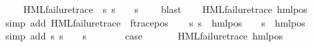 \begin{isabellebody}
\ \isamarkupfalse%
\ {\isasympsi}\ \ {\isachardoublequoteopen}HML{\isacharunderscore}{\kern0pt}failure{\isacharunderscore}{\kern0pt}trace\ {\isasympsi}{\isachardoublequoteclose}\ {\isachardoublequoteopen}{\isacharparenleft}{\kern0pt}{\isasymforall}s{\isachardot}{\kern0pt}\ {\isacharparenleft}{\kern0pt}s\ {\isasymTurnstile}\ {\isasymphi}{\isacharparenright}{\kern0pt}\ {\isacharequal}{\kern0pt}\ {\isacharparenleft}{\kern0pt}s\ {\isasymTurnstile}\ {\isasympsi}{\isacharparenright}{\kern0pt}{\isacharparenright}{\kern0pt}{\isachardoublequoteclose}\ \isamarkupfalse%
\ blast\isanewline
\ \ \isamarkupfalse%
\ {\isachardoublequoteopen}HML{\isacharunderscore}{\kern0pt}failure{\isacharunderscore}{\kern0pt}trace\ {\isacharparenleft}{\kern0pt}hml{\isacharunderscore}{\kern0pt}pos\ {\isasymalpha}\ {\isasympsi}{\isacharparenright}{\kern0pt}{\isachardoublequoteclose}\ \isanewline
\ \ \ \ \isamarkupfalse%
\ {\isacharparenleft}{\kern0pt}simp\ add{\isacharcolon}{\kern0pt}\ {\isacartoucheopen}HML{\isacharunderscore}{\kern0pt}failure{\isacharunderscore}{\kern0pt}trace\ {\isasympsi}{\isacartoucheclose}\ f{\isacharunderscore}{\kern0pt}trace{\isacharunderscore}{\kern0pt}pos{\isacharparenright}{\kern0pt}\isanewline
\ \ \isamarkupfalse%
\ {\isachardoublequoteopen}{\isacharparenleft}{\kern0pt}{\isasymforall}s{\isachardot}{\kern0pt}\ {\isacharparenleft}{\kern0pt}s\ {\isasymTurnstile}\ hml{\isacharunderscore}{\kern0pt}pos\ {\isasymalpha}\ {\isasymphi}{\isacharparenright}{\kern0pt}\ {\isacharequal}{\kern0pt}\ {\isacharparenleft}{\kern0pt}s\ {\isasymTurnstile}\ {\isacharparenleft}{\kern0pt}hml{\isacharunderscore}{\kern0pt}pos\ {\isasymalpha}\ {\isasympsi}{\isacharparenright}{\kern0pt}{\isacharparenright}{\kern0pt}{\isacharparenright}{\kern0pt}{\isachardoublequoteclose}\ \isanewline
\ \ \ \ \isamarkupfalse%
\ {\isacharparenleft}{\kern0pt}simp\ add{\isacharcolon}{\kern0pt}\ {\isacartoucheopen}{\isasymforall}s{\isachardot}{\kern0pt}\ {\isacharparenleft}{\kern0pt}s\ {\isasymTurnstile}\ {\isasymphi}{\isacharparenright}{\kern0pt}\ {\isacharequal}{\kern0pt}\ {\isacharparenleft}{\kern0pt}s\ {\isasymTurnstile}\ {\isasympsi}{\isacharparenright}{\kern0pt}{\isacartoucheclose}{\isacharparenright}{\kern0pt}\isanewline
\ \ \isamarkupfalse%
\ \isamarkupfalse%
\ {\isacharquery}{\kern0pt}case\ \isanewline
\ \ \ \ \isamarkupfalse%
\ {\isacartoucheopen}HML{\isacharunderscore}{\kern0pt}failure{\isacharunderscore}{\kern0pt}trace\ {\isacharparenleft}{\kern0pt}hml{\isacharunderscore}{\kern0pt}pos\ {\isasymalpha}\ {\isasympsi}{\isacharparenright}{\kern0pt}{\isacartoucheclose}\ \isamarkupfalse%

\end{isabellebody}
